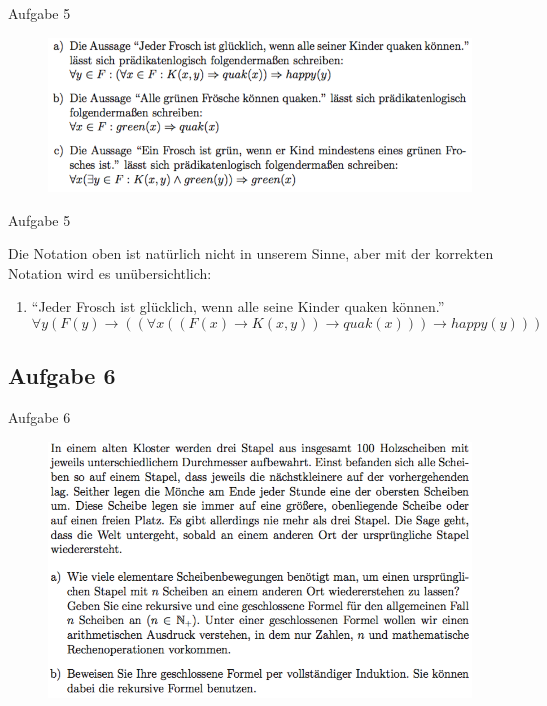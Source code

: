 \begin{frame}{Aufgabe 5}
\begin{figure}[h!]
		\centering
		\includegraphics[width=\textwidth]{../topics/weihnachtstut-aufgaben/12.png} 
\end{figure} 

\end{frame}   
   	
\begin{frame}{Aufgabe 5}
	
		Die Notation oben ist natürlich nicht in unserem Sinne, aber mit der korrekten Notation wird es unübersichtlich: \\[1em]

		\begin{enumerate}
			\item \enquote{Jeder Frosch ist glücklich, wenn alle seine Kinder quaken können.} \\[.3em]
				\[ \forall y (F(y) \rightarrow ((\forall x ((F(x) \rightarrow K(x,y)) \rightarrow quak(x) )) \rightarrow happy(y))) \]
		\end{enumerate}

\end{frame}

\subsection{Aufgabe 6}
\begin{frame}{Aufgabe 6}
\begin{figure}[h!]
		\centering
		\includegraphics[width=\textwidth]{../topics/weihnachtstut-aufgaben/13.png} 
	\end{figure}     
\end{frame}

